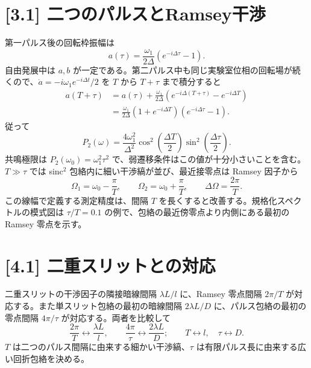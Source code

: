 \documentclass[11pt,a4paper]{article}
\begin{document}
\section*{[3.1] 二つのパルスとRamsey干渉}
第一パルス後の回転枠振幅は
\[
a(\tau)=\frac{\omega_1}{2\Delta}(e^{-i\Delta\tau}-1).
\]
自由発展中は $a,b$ が一定である。第二パルス中も同じ実験室位相の回転場が続くので、$\dot a=-i\omega_1e^{-i\Delta t}/2$ を $T$ から $T+\tau$ まで積分すると
\begin{align*}
a(T+\tau)&=a(\tau)+\frac{\omega_1}{2\Delta}(e^{-i\Delta(T+\tau)}-e^{-i\Delta T})\\
&=\frac{\omega_1}{2\Delta}(1+e^{-i\Delta T})(e^{-i\Delta\tau}-1).
\end{align*}
従って
\[
\boxed{P_2(\omega)=\frac{4\omega_1^2}{\Delta^2}\cos^2\!\left(\frac{\Delta T}{2}\right)
\sin^2\!\left(\frac{\Delta\tau}{2}\right)}.
\]
共鳴極限は $P_2(\omega_0)=\omega_1^2\tau^2$ で、弱遷移条件はこの値が十分小さいことを含む。$T\gg\tau$ では sinc$^2$ 包絡内に細い干渉縞が並び、最近接零点は Ramsey 因子から
\[
\boxed{\Omega_1=\omega_0-\frac{\pi}{T},\qquad
\Omega_2=\omega_0+\frac{\pi}{T}},\qquad
\boxed{\Delta\Omega=\frac{2\pi}{T}}.
\]
この線幅で定義する測定精度は、間隔 $T$ を長くすると改善する。規格化スペクトルの模式図は $\tau/T=0.1$ の例で、包絡の最近傍零点より内側にある最初の Ramsey 零点を示す。
\begin{center}
\end{center}

\section*{[4.1] 二重スリットとの対応}
二重スリットの干渉因子の隣接暗線間隔 $\lambda L/l$ に、Ramsey 零点間隔 $2\pi/T$ が対応する。また単スリット包絡の最初の暗線間隔 $2\lambda L/D$ に、パルス包絡の最初の零点間隔 $4\pi/\tau$ が対応する。両者を比較して
\[
\frac{2\pi}{T}\leftrightarrow\frac{\lambda L}{l},\qquad
\frac{4\pi}{\tau}\leftrightarrow\frac{2\lambda L}{D};
\qquad \boxed{T\leftrightarrow l,\quad \tau\leftrightarrow D}.
\]
$T$ は二つのパルス間隔に由来する細かい干渉縞、$\tau$ は有限パルス長に由来する広い回折包絡を決める。
\end{document}
